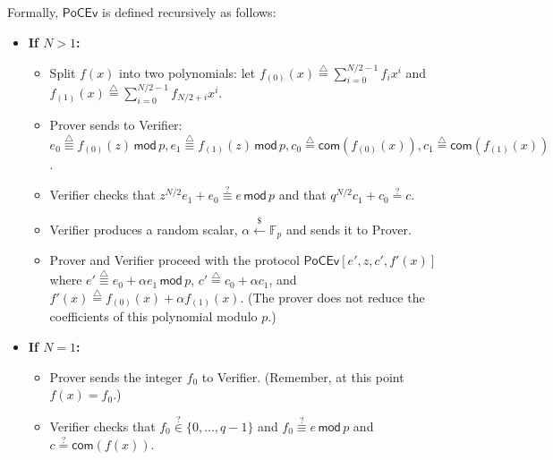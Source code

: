 \documentclass[10pt]{llncs}
\begin{document}
Formally, $\mathsf{PoCEv}$ is defined recursively as follows:
\begin{itemize} 
\item {\bf If $N > 1$:}
\begin{itemize}
\item Split $f(x)$ into two polynomials: let $f_{(0)}(x) \stackrel{\triangle}{=} \sum_{i=0}^{N/2-1} f_i x^i$ and $f_{(1)}(x) \stackrel{\triangle}{=} \sum_{i=0}^{N/2-1} f_{N/2+i} x^i$.
\item Prover sends to Verifier: $e_0 \stackrel{\triangle}{\equiv} f_{(0)}(z) \, \mathsf{mod} \, p, e_1 \stackrel{\triangle}{\equiv} f_{(1)}(z) \, \mathsf{mod} \, p, c_0 \stackrel{\triangle}{=} \mathsf{com}(f_{(0)}(x)), c_1 \stackrel{\triangle}{=} \mathsf{com}(f_{(1)}(x))$.
\item Verifier checks that $z^{N/2}e_1 + e_0 \stackrel{?}{\equiv} e \, \mathsf{mod} \, p$ and that $q^{N/2} c_1 + c_0 \stackrel{?}{=} c$.
\item Verifier produces a random scalar, $\alpha \xleftarrow{\$} \mathbb{F}_p$ and sends it to Prover.
\item Prover and Verifier proceed with the protocol $\mathsf{PoCEv}[e', z, c', f'(x)]$ where $e' \stackrel{\triangle}{\equiv} e_0 + \alpha{}e_1 \, \mathsf{mod} \, p$, $c' \stackrel{\triangle}{=} c_0 + \alpha{}c_1$, and $f'(x) \stackrel{\triangle}{=} f_{(0)}(x) + \alpha{}f_{(1)}(x)$. (The prover does not reduce the coefficients of this polynomial modulo $p$.)
\end{itemize}
\item {\bf If $N = 1$:}
\begin{itemize}
\item Prover sends the integer $f_0$ to Verifier. (Remember, at this point $f(x) = f_0$.)
\item Verifier checks that $f_0 \stackrel{?}{\in} \{0, \ldots, q-1\}$ and $f_0 \stackrel{?}{\equiv} e \, \mathsf{mod} \, p$ and $c \stackrel{?}{=} \mathsf{com}(f(x))$.
\end{itemize}
\end{itemize}
\end{document}
